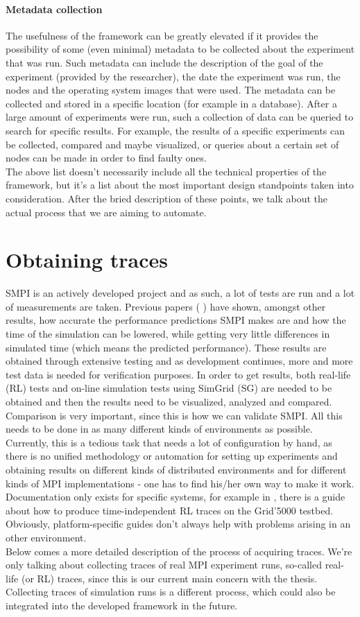 \paragraph{Metadata collection}
The usefulness of the framework can be greatly elevated if it provides
the possibility of some (even minimal) metadata to be collected about
the experiment that was run. Such metadata can include the description
of the goal of the experiment (provided by the researcher), the date
the experiment was run, the nodes and the operating system images that
were used. The metadata can be collected and stored in a specific
location (for example in a database). After a large amount of
experiments were run, such a collection of data can be queried to
search for specific results. For example, the results of a specific
experiments can be collected, compared and maybe visualized, or
queries about a certain set of nodes can be made in order to find
faulty ones.\\
The above list doesn't necessarily include all the technical
properties of the framework, but it's a list about the most important
design standpoints taken into consideration. After the bried
description of these points, we talk about the actual process that we
are aiming to automate.
\section{Obtaining traces}
SMPI is an actively developed project and as such, a lot of tests are
run and a lot of measurements are taken. Previous papers
(\cite{csgscq11} \cite{bdglmqssv13}) have shown, amongst other
results, how accurate the performance predictions SMPI makes are and
how the time of the simulation can be lowered, while getting very
little differences in simulated time (which means the predicted
performance). These results are obtained through extensive testing and
as development continues, more and more test data is needed for
verification purposes. In order to get results, both
real-life (RL) tests and on-line simulation tests using SimGrid (SG)
are needed to be obtained and then the results need to be visualized,
analyzed and compared. Comparison is very important, since this is how
we can validate SMPI. All this needs to be done in as many different
kinds of environments as possible. Currently, this is a tedious task
that needs a lot of configuration by hand, as there is no unified
methodology or automation for setting up experiments and obtaining
results on
different kinds of distributed environments and for different kinds of
MPI implementations - one has to find his/her own way to make it
work. Documentation only exists for specific systems, for example in
\cite{ms11}, there is a guide about how to produce time-independent RL
traces on the Grid'5000 testbed. Obviously, platform-specific guides
don't always help with problems arising in an other environment.\\
Below comes a more detailed description of the process of acquiring
traces. We're only talking about collecting traces of real MPI
experiment runs, so-called real-life (or RL) traces, since this is our
current main concern with the thesis. Collecting traces of simulation
runs is a different process, which could also be integrated into the
developed framework in the future.
